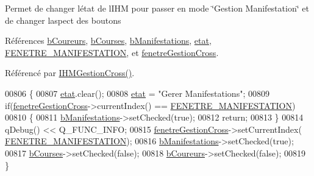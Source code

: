 Permet de changer l\textquotesingle{}état de l\textquotesingle{}I\+HM pour passer en mode \char`\"{}\+Gestion Manifestation\char`\"{} et de changer l\textquotesingle{}aspect des boutons 

Références \hyperlink{class_i_h_m_gestion_cross_ac2819198bae00b7e0f23e8bc491b4cbb}{b\+Coureurs}, \hyperlink{class_i_h_m_gestion_cross_a0df377aec07ada51a115cc458854c966}{b\+Courses}, \hyperlink{class_i_h_m_gestion_cross_a540b4525e546b6d61988245ae53768ce}{b\+Manifestations}, \hyperlink{class_i_h_m_gestion_cross_a5da4390d71dbd5d05cff339f93c7c85a}{etat}, \hyperlink{ihmgestioncross_8h_a7e5d9be785cb8f39015a5b28018e27ae}{F\+E\+N\+E\+T\+R\+E\+\_\+\+M\+A\+N\+I\+F\+E\+S\+T\+A\+T\+I\+ON}, et \hyperlink{class_i_h_m_gestion_cross_a2ae4807c25f35813507ff0a2abb2ffb3}{fenetre\+Gestion\+Cross}.



Référencé par \hyperlink{class_i_h_m_gestion_cross_a2c62fd83326a87456a403f46acc408c8}{I\+H\+M\+Gestion\+Cross()}.


\begin{DoxyCode}
00806 \{
00807     \hyperlink{class_i_h_m_gestion_cross_a5da4390d71dbd5d05cff339f93c7c85a}{etat}.clear();
00808     \hyperlink{class_i_h_m_gestion_cross_a5da4390d71dbd5d05cff339f93c7c85a}{etat} = \textcolor{stringliteral}{"Gerer Manifestations"};
00809     \textcolor{keywordflow}{if}(\hyperlink{class_i_h_m_gestion_cross_a2ae4807c25f35813507ff0a2abb2ffb3}{fenetreGestionCross}->currentIndex() == 
      \hyperlink{ihmgestioncross_8h_a7e5d9be785cb8f39015a5b28018e27ae}{FENETRE\_MANIFESTATION})
00810     \{
00811         \hyperlink{class_i_h_m_gestion_cross_a540b4525e546b6d61988245ae53768ce}{bManifestations}->setChecked(\textcolor{keyword}{true});
00812         \textcolor{keywordflow}{return};
00813     \}
00814     qDebug() << Q\_FUNC\_INFO;
00815     \hyperlink{class_i_h_m_gestion_cross_a2ae4807c25f35813507ff0a2abb2ffb3}{fenetreGestionCross}->setCurrentIndex(
      \hyperlink{ihmgestioncross_8h_a7e5d9be785cb8f39015a5b28018e27ae}{FENETRE\_MANIFESTATION});
00816     \hyperlink{class_i_h_m_gestion_cross_a540b4525e546b6d61988245ae53768ce}{bManifestations}->setChecked(\textcolor{keyword}{true});
00817     \hyperlink{class_i_h_m_gestion_cross_a0df377aec07ada51a115cc458854c966}{bCourses}->setChecked(\textcolor{keyword}{false});
00818     \hyperlink{class_i_h_m_gestion_cross_ac2819198bae00b7e0f23e8bc491b4cbb}{bCoureurs}->setChecked(\textcolor{keyword}{false});
00819 \}
\end{DoxyCode}
\mbox{\label{class_i_h_m_gestion_cross_aa1c728319c825df582a014fc5bd43ea4}} 
